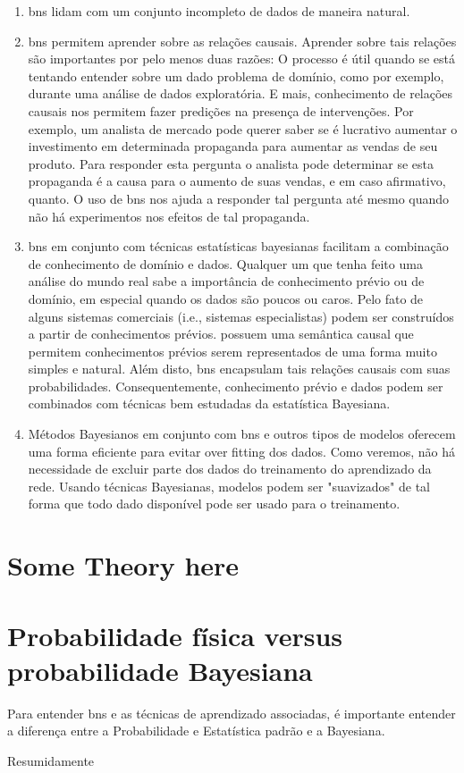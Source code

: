 \begin{enumerate}
	\item \glspl{bn} lidam com um conjunto incompleto de dados de maneira natural.

	\item \glspl{bn} permitem aprender sobre as relações causais. Aprender sobre tais relações são importantes por pelo menos duas razões: O processo é útil quando se está tentando entender sobre um dado problema de domínio, como por exemplo, durante uma análise de dados exploratória.  E mais, conhecimento de relações causais nos permitem fazer predições na presença de intervenções. Por exemplo, um analista de mercado pode querer saber se é lucrativo aumentar o investimento em determinada propaganda para aumentar as vendas de seu produto. Para responder esta pergunta o analista pode determinar se esta propaganda é a causa para o aumento de suas vendas, e em caso afirmativo, quanto. O uso de \glspl{bn} nos ajuda a responder tal pergunta até mesmo quando não há experimentos nos efeitos de tal propaganda.
	
	\item \glspl{bn} em conjunto com técnicas estatísticas bayesianas facilitam a combinação de conhecimento de domínio e dados. Qualquer um que tenha feito uma análise do mundo real sabe a importância de conhecimento prévio ou de domínio, em especial quando os dados são poucos ou caros. Pelo fato de alguns sistemas comerciais (i.e., sistemas especialistas) podem ser construídos a partir de conhecimentos prévios.  possuem uma semântica causal que permitem conhecimentos prévios serem representados de uma forma muito simples e natural. Além disto, \glspl{bn} encapsulam tais relações causais com suas probabilidades. Consequentemente, conhecimento prévio e dados podem ser combinados com técnicas bem estudadas da estatística Bayesiana.
	
	\item Métodos Bayesianos em conjunto com \glspl{bn} e outros tipos de modelos oferecem uma forma eficiente para evitar over fitting dos dados. Como veremos, não há necessidade de excluir parte dos dados do treinamento do aprendizado da rede. Usando técnicas Bayesianas, modelos podem ser "suavizados" de tal forma que todo dado disponível pode ser usado para o treinamento.

\end{enumerate}
\section{Some Theory here}
\section{Probabilidade física versus probabilidade Bayesiana}
Para entender \glspl{bn} e as técnicas de aprendizado associadas, é importante entender a diferença entre a Probabilidade e Estatística padrão e a Bayesiana.

Resumidamente
